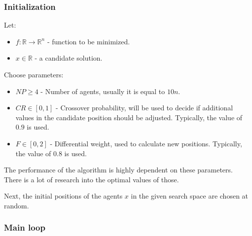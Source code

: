 \documentclass[a4paper,12pt]{article}
\begin{document}
\subsubsection*{Initialization}

Let:

\begin{itemize}
  \item $f: \mathbb{R} \rightarrow \mathbb{R}^n$ - function to be minimized.
  \item $x \in \mathbb{R}$ - a candidate solution.
\end{itemize}

Choose parameters:

\begin{itemize}
  \item $NP \geq 4$ - Number of agents, usually it is equal to $10n$.
  \item $CR \in [0, 1]$ - Crossover probability, will be used to decide if
    additional values in the candidate position should be adjusted. Typically,
    the value of $0.9$ is used.
  \item $F \in [0, 2]$ - Differential weight, used to calculate new positions.
    Typically, the value of $0.8$ is used.
\end{itemize}

The performance of the algorithm is highly dependent on these parameters. There
is a lot of research into the optimal values of those.

\vspace{5mm}

Next, the initial positions of the agents $x$ in the given search space are
chosen at random.

\subsubsection*{Main loop}
\end{document}
